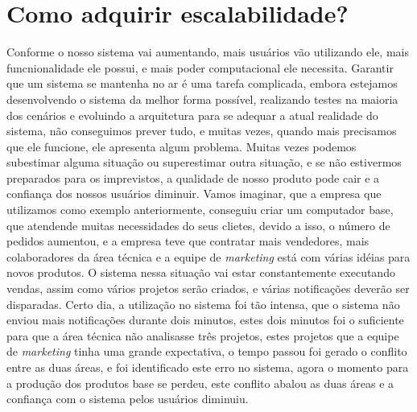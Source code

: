   \chapter{Como adquirir escalabilidade?}
    Conforme o nosso sistema vai aumentando, mais usuários vão utilizando ele,
    mais funcnionalidade ele possui, e mais poder computacional ele necessita.
    Garantir que um sistema se mantenha no ar é uma tarefa complicada, embora
    estejamos desenvolvendo o sistema da melhor forma possível, realizando testes
    na maioria dos cenários e evoluindo a arquitetura para se adequar a atual
    realidade do sistema, não conseguimos prever tudo, e muitas vezes, quando
    mais precisamos que ele funcione, ele apresenta algum problema. Muitas vezes
    podemos subestimar alguma situação ou superestimar outra situação, e se não
    estivermos preparados para os imprevistos, a qualidade de nosso produto pode
    cair e a confiança dos nossos usuários diminuir. \newline
    Vamos imaginar, que a empresa que utilizamos como exemplo anteriormente,
    conseguiu criar um computador base, que atendende muitas necessidades do seus
    clietes, devido a isso, o número de pedidos aumentou, e a empresa teve que
    contratar mais vendedores, mais colaboradores da área técnica e a equipe de
    \textit{marketing} está com várias idéias para novos produtos. O sistema
    nessa situação vai estar constantemente executando vendas, assim como vários
    projetos serão criados, e várias notificações deverão ser disparadas. Certo
    dia, a utilização no sistema foi tão intensa, que o sistema não enviou mais
    notificações durante dois minutos, estes dois minutos foi o suficiente para
    que a área técnica não analisasse três projetos, estes projetos que a equipe
    de \textit{marketing} tinha uma grande expectativa, o tempo passou foi gerado
    o conflito entre as duas áreas, e foi identificado este erro no sistema,
    agora o momento para a produção dos produtos base se perdeu, este conflito
    abalou as duas áreas e a confiança com o sistema pelos usuários diminuiu.

